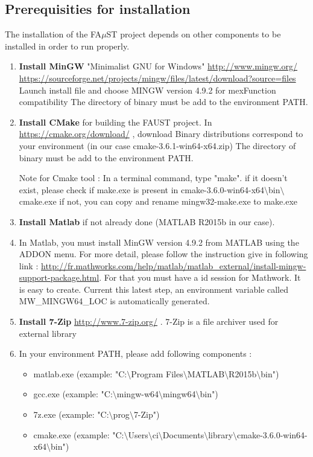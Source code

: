 \subsection{Prerequisities for installation}\label{sec:WinPrerequisitiesInstall}
The installation of the FA$\mu$ST project depends on other components to be installed in order to run properly. 
\begin{enumerate}
\item \textbf{Install MinGW} "Minimalist GNU for Windows" \url{http://www.mingw.org/}
\url{https://sourceforge.net/projects/mingw/files/latest/download?source=files}
Launch install file and choose MINGW version 4.9.2 for mexFunction compatibility 
The directory of binary must be add to the environment PATH. 

\item \textbf{Install CMake} for building the FAUST project. 
In \url{https://cmake.org/download/} , download Binary distributions correspond to your environment (in our case  cmake-3.6.1-win64-x64.zip)
The directory of binary must be add to the environment PATH. 

Note for Cmake tool : In a terminal command, type "make". if it doesn't exist, please check if make.exe is present in cmake-3.6.0-win64-x64$\setminus$bin$\setminus$cmake.exe
if not, you can copy and rename mingw32-make.exe to make.exe

\item \textbf{Install Matlab} if not already done (MATLAB R2015b in our case).

\item In Matlab, you must install MinGW version 4.9.2 from MATLAB using the ADDON menu. For more detail, please follow the instruction give in following link :  
\url{http://fr.mathworks.com/help/matlab/matlab_external/install-mingw-support-package.html}. For that you must have a id session for Mathwork. It is easy to create. 
Current this latest step, an environment variable called MW\_MINGW64\_LOC is automatically generated. 

\item \textbf{Install 7-Zip} \url{http://www.7-zip.org/} . 7-Zip is a file archiver used for external library

\item In your environment PATH, please add following components :

\begin{itemize}
\item matlab.exe (example: "C:$\setminus$Program Files$\setminus$MATLAB$\setminus$R2015b$\setminus$bin")
\item gcc.exe (example: "C:$\setminus$mingw-w64$\setminus$mingw64$\setminus$bin") 
\item 7z.exe (example: "C:$\setminus$prog$\setminus$7-Zip")
\item cmake.exe (example: "C:$\setminus$Users$\setminus$ci$\setminus$Documents$\setminus$library$\setminus$cmake-3.6.0-win64-x64$\setminus$bin")
\end{itemize}
\end{enumerate}


